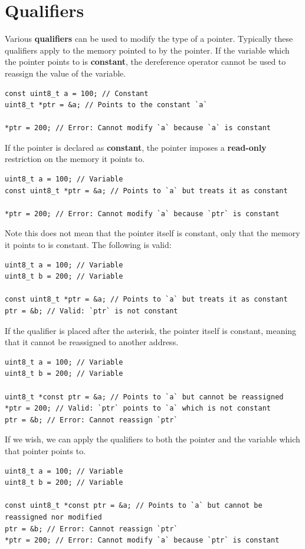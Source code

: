 \documentclass{report}
\begin{document}
\section{Qualifiers}
Various \textbf{qualifiers} can be used to modify the type of a pointer.
Typically these qualifiers apply to the memory pointed to by the pointer.
If the variable which the pointer points to is \textbf{constant}, the dereference operator
cannot be used to reassign the value of the variable.
\begin{verbatim}
const uint8_t a = 100; // Constant
uint8_t *ptr = &a; // Points to the constant `a`

*ptr = 200; // Error: Cannot modify `a` because `a` is constant
\end{verbatim}
If the pointer is declared as \textbf{constant}, the pointer imposes
a \textbf{read-only} restriction on the memory it points to.
\begin{verbatim}
uint8_t a = 100; // Variable
const uint8_t *ptr = &a; // Points to `a` but treats it as constant

*ptr = 200; // Error: Cannot modify `a` because `ptr` is constant
\end{verbatim}
Note this does not mean that the pointer itself is constant, only that the memory it points to is constant.
The following is valid:
\begin{verbatim}
uint8_t a = 100; // Variable
uint8_t b = 200; // Variable

const uint8_t *ptr = &a; // Points to `a` but treats it as constant
ptr = &b; // Valid: `ptr` is not constant
\end{verbatim}
If the qualifier is placed after the asterisk, the pointer itself is constant, meaning that
it cannot be reassigned to another address.
\begin{verbatim}
uint8_t a = 100; // Variable
uint8_t b = 200; // Variable

uint8_t *const ptr = &a; // Points to `a` but cannot be reassigned
*ptr = 200; // Valid: `ptr` points to `a` which is not constant
ptr = &b; // Error: Cannot reassign `ptr`
\end{verbatim}
If we wish, we can apply the qualifiers to both the pointer and the variable which that pointer points to.
\begin{verbatim}
uint8_t a = 100; // Variable
uint8_t b = 200; // Variable

const uint8_t *const ptr = &a; // Points to `a` but cannot be reassigned nor modified
ptr = &b; // Error: Cannot reassign `ptr`
*ptr = 200; // Error: Cannot modify `a` because `ptr` is constant
\end{verbatim}
\end{document}
